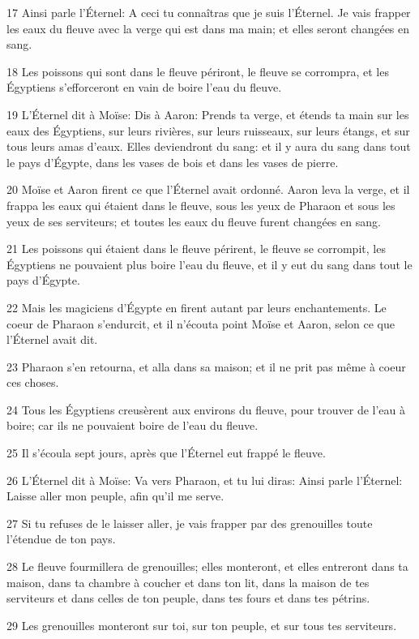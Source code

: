 \par 17 Ainsi parle l'Éternel: A ceci tu connaîtras que je suis l'Éternel. Je vais frapper les eaux du fleuve avec la verge qui est dans ma main; et elles seront changées en sang.
\par 18 Les poissons qui sont dans le fleuve périront, le fleuve se corrompra, et les Égyptiens s'efforceront en vain de boire l'eau du fleuve.
\par 19 L'Éternel dit à Moïse: Dis à Aaron: Prends ta verge, et étends ta main sur les eaux des Égyptiens, sur leurs rivières, sur leurs ruisseaux, sur leurs étangs, et sur tous leurs amas d'eaux. Elles deviendront du sang: et il y aura du sang dans tout le pays d'Égypte, dans les vases de bois et dans les vases de pierre.
\par 20 Moïse et Aaron firent ce que l'Éternel avait ordonné. Aaron leva la verge, et il frappa les eaux qui étaient dans le fleuve, sous les yeux de Pharaon et sous les yeux de ses serviteurs; et toutes les eaux du fleuve furent changées en sang.
\par 21 Les poissons qui étaient dans le fleuve périrent, le fleuve se corrompit, les Égyptiens ne pouvaient plus boire l'eau du fleuve, et il y eut du sang dans tout le pays d'Égypte.
\par 22 Mais les magiciens d'Égypte en firent autant par leurs enchantements. Le coeur de Pharaon s'endurcit, et il n'écouta point Moïse et Aaron, selon ce que l'Éternel avait dit.
\par 23 Pharaon s'en retourna, et alla dans sa maison; et il ne prit pas même à coeur ces choses.
\par 24 Tous les Égyptiens creusèrent aux environs du fleuve, pour trouver de l'eau à boire; car ils ne pouvaient boire de l'eau du fleuve.
\par 25 Il s'écoula sept jours, après que l'Éternel eut frappé le fleuve.
\par 26 L'Éternel dit à Moïse: Va vers Pharaon, et tu lui diras: Ainsi parle l'Éternel: Laisse aller mon peuple, afin qu'il me serve.
\par 27 Si tu refuses de le laisser aller, je vais frapper par des grenouilles toute l'étendue de ton pays.
\par 28 Le fleuve fourmillera de grenouilles; elles monteront, et elles entreront dans ta maison, dans ta chambre à coucher et dans ton lit, dans la maison de tes serviteurs et dans celles de ton peuple, dans tes fours et dans tes pétrins.
\par 29 Les grenouilles monteront sur toi, sur ton peuple, et sur tous tes serviteurs.

